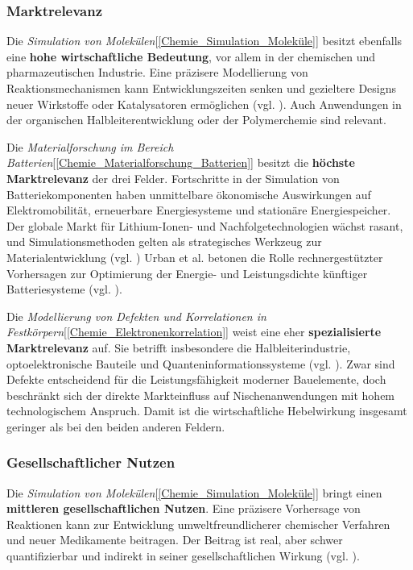 \subsubsection{Marktrelevanz}

Die \textit{Simulation von Molekülen}[\ref{Chemie_Simulation_Moleküle}] besitzt ebenfalls eine \textbf{hohe wirtschaftliche Bedeutung}, vor allem in der chemischen und pharmazeutischen Industrie. Eine präzisere Modellierung von Reaktionsmechanismen kann Entwicklungszeiten senken und gezieltere Designs neuer Wirkstoffe oder Katalysatoren ermöglichen (vgl. \cite{mcardle_quantum_2020}). Auch Anwendungen in der organischen Halbleiterentwicklung oder der Polymerchemie sind relevant.

\vspace{0.5em}

Die \textit{Materialforschung im Bereich Batterien}[\ref{Chemie_Materialforschung_Batterien}] besitzt die \textbf{höchste Marktrelevanz} der drei Felder. Fortschritte in der Simulation von Batteriekomponenten haben unmittelbare ökonomische Auswirkungen auf Elektromobilität, erneuerbare Energiesysteme und stationäre Energiespeicher. Der globale Markt für Lithium-Ionen- und Nachfolgetechnologien wächst rasant, und Simulationsmethoden gelten als strategisches Werkzeug zur Materialentwicklung (vgl. \cite{demirApplicationQuantumComputing2024}) Urban et al. betonen die Rolle rechnergestützter Vorhersagen zur Optimierung der Energie- und Leistungsdichte künftiger Batteriesysteme (vgl. \cite{urban_computational_2016}).

\vspace{0.5em}

Die \textit{Modellierung von Defekten und Korrelationen in Festkörpern}[\ref{Chemie_Elektronenkorrelation}] weist eine eher \textbf{spezialisierte Marktrelevanz} auf. Sie betrifft insbesondere die Halbleiterindustrie, optoelektronische Bauteile und Quanteninformationssysteme (vgl. \cite{bassett_quantum_2019}). Zwar sind Defekte entscheidend für die Leistungsfähigkeit moderner Bauelemente, doch beschränkt sich der direkte Markteinfluss auf Nischenanwendungen mit hohem technologischem Anspruch. Damit ist die wirtschaftliche Hebelwirkung insgesamt geringer als bei den beiden anderen Feldern.

\subsubsection{Gesellschaftlicher Nutzen}

Die \textit{Simulation von Molekülen}[\ref{Chemie_Simulation_Moleküle}] bringt einen \textbf{mittleren gesellschaftlichen Nutzen}. Eine präzisere Vorhersage von Reaktionen kann zur Entwicklung umweltfreundlicherer chemischer Verfahren und neuer Medikamente beitragen. Der Beitrag ist real, aber schwer quantifizierbar und indirekt in seiner gesellschaftlichen Wirkung (vgl. \cite{mcardle_quantum_2020}).

